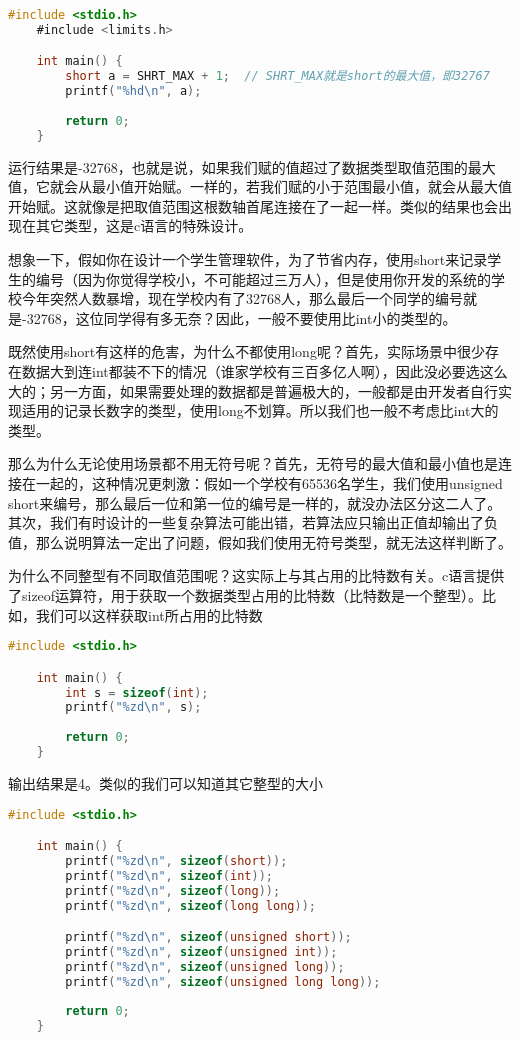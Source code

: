 \begin{lstlisting}[language=C]
    #include <stdio.h>
    #include <limits.h>

    int main() {
        short a = SHRT_MAX + 1;  // SHRT_MAX就是short的最大值，即32767
        printf("%hd\n", a);
        
        return 0;
    } 
\end{lstlisting}

运行结果是-32768，也就是说，如果我们赋的值超过了数据类型取值范围的最大值，它就会从最小值开始赋。一样的，若我们赋的小于范围最小值，就会从最大值开始赋。这就像是把取值范围这根数轴首尾连接在了一起一样。类似的结果也会出现在其它类型，这是c语言的特殊设计。

想象一下，假如你在设计一个学生管理软件，为了节省内存，使用short来记录学生的编号（因为你觉得学校小，不可能超过三万人），但是使用你开发的系统的学校今年突然人数暴增，现在学校内有了32768人，那么最后一个同学的编号就是-32768，这位同学得有多无奈？因此，一般不要使用比int小的类型的。

既然使用short有这样的危害，为什么不都使用long呢？首先，实际场景中很少存在数据大到连int都装不下的情况（谁家学校有三百多亿人啊），因此没必要选这么大的；另一方面，如果需要处理的数据都是普遍极大的，一般都是由开发者自行实现适用的记录长数字的类型，使用long不划算。所以我们也一般不考虑比int大的类型。

那么为什么无论使用场景都不用无符号呢？首先，无符号的最大值和最小值也是连接在一起的，这种情况更刺激：假如一个学校有65536名学生，我们使用unsigned short来编号，那么最后一位和第一位的编号是一样的，就没办法区分这二人了。其次，我们有时设计的一些复杂算法可能出错，若算法应只输出正值却输出了负值，那么说明算法一定出了问题，假如我们使用无符号类型，就无法这样判断了。

为什么不同整型有不同取值范围呢？这实际上与其占用的比特数有关。c语言提供了sizeof运算符，用于获取一个数据类型占用的比特数（比特数是一个整型）。比如，我们可以这样获取int所占用的比特数

\begin{lstlisting}[language=C]
    #include <stdio.h>

    int main() {
        int s = sizeof(int);
        printf("%zd\n", s);
        
        return 0;
    } 
\end{lstlisting}

输出结果是4。类似的我们可以知道其它整型的大小

\begin{lstlisting}[language=C]
    #include <stdio.h>

    int main() {
        printf("%zd\n", sizeof(short));
        printf("%zd\n", sizeof(int));
        printf("%zd\n", sizeof(long));
        printf("%zd\n", sizeof(long long));

        printf("%zd\n", sizeof(unsigned short));
        printf("%zd\n", sizeof(unsigned int));
        printf("%zd\n", sizeof(unsigned long));
        printf("%zd\n", sizeof(unsigned long long));
        
        return 0;
    }
\end{lstlisting}

